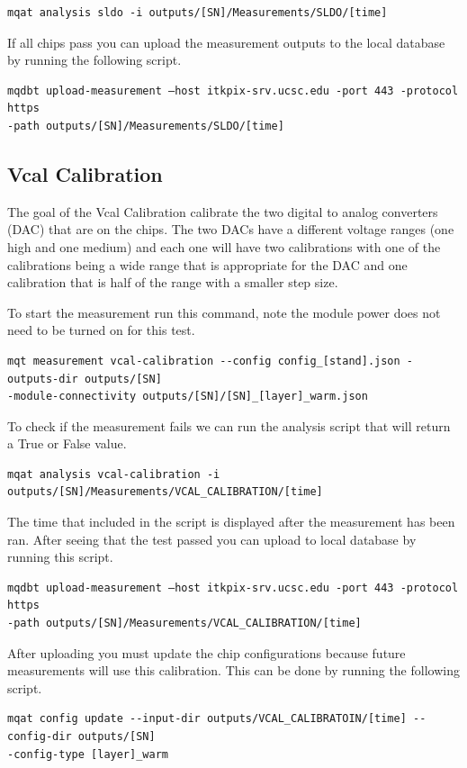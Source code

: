 \documentclass[12pt]{article}
\begin{document}
\begin{verbatim}
mqat analysis sldo -i outputs/[SN]/Measurements/SLDO/[time]
\end{verbatim}
If all chips pass you can upload the measurement outputs to the local database by running the following script. 
\begin{verbatim}
mqdbt upload-measurement –host itkpix-srv.ucsc.edu -port 443 -protocol https
-path outputs/[SN]/Measurements/SLDO/[time]
\end{verbatim}


\subsection{Vcal Calibration}

The goal of the Vcal Calibration calibrate the two digital to analog converters (DAC) that are on the chips. The two DACs have a different voltage ranges (one high and one medium) and each one will have two calibrations with one of the calibrations being a wide range that is appropriate for the DAC and one calibration that is half of the range with a smaller step size.

To start the measurement run this command, note the module power does not need to be turned on for this test.

\begin{verbatim}
mqt measurement vcal-calibration --config config_[stand].json -outputs-dir outputs/[SN]
-module-connectivity outputs/[SN]/[SN]_[layer]_warm.json
\end{verbatim}

To check if the measurement fails we can run the analysis script that will return a True or False value. 
\begin{verbatim}
mqat analysis vcal-calibration -i outputs/[SN]/Measurements/VCAL_CALIBRATION/[time]
\end{verbatim}

The time that included in the script is displayed after the measurement has been ran. After seeing that the test passed you can upload to local database by running this script. 

\begin{verbatim}
mqdbt upload-measurement –host itkpix-srv.ucsc.edu -port 443 -protocol https
-path outputs/[SN]/Measurements/VCAL_CALIBRATION/[time]
\end{verbatim}

After uploading you must update the chip configurations because future measurements will use this calibration. This can be done by running the following script. 
\begin{verbatim}
mqat config update --input-dir outputs/VCAL_CALIBRATOIN/[time] --config-dir outputs/[SN] 
-config-type [layer]_warm
\end{verbatim}
\end{document}

